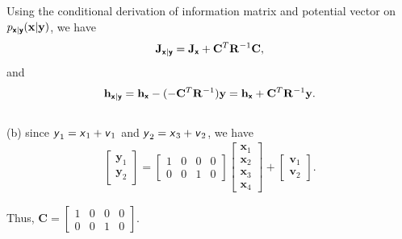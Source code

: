 \documentclass{article}
\newcommand{\s}[1]{\textsf{\textit{#1}}}
\newcommand{\bs}[1]{\textsf{\textbf{#1}}}
\newcommand{\bm}{\mathbf}
\begin{document}
Using the conditional derivation of information matrix and potential vector on $p_{\bs{x}|\bs{y}}(\bm{x}| \bm{y})$, we have
\begin{align*}
	\bm{J}_{\bs{x}|\bs{y}} = \bm{J}_\bs{x}+\bm{C}^T\bm{R}^{-1}\bm{C},
\end{align*}
and
\begin{align*}
	\bm{h}_{\bs{x}|\bs{y}} = \bm{h}_{\bs{x}} - (-\bm{C}^T\bm{R}^{-1})\bm{y} = \bm{h}_{\bs{x}} + \bm{C}^T\bm{R}^{-1}\bm{y}.
\end{align*}
\\

\noindent
(b) since $\s{y}_1 = \s{x}_1 + \s{v}_1$ and $\s{y}_2 = \s{x}_3 + \s{v}_2$, we have
\begin{align*}
\begin{bmatrix}
    \bm{y}_{1}\\
    \bm{y}_{2}
\end{bmatrix} = 
\begin{bmatrix}
    1 & 0 & 0 & 0 \\
    0 & 0 & 1 & 0
\end{bmatrix}
\begin{bmatrix}
    \bm{x}_{1}\\
    \bm{x}_{2}\\
    \bm{x}_{3}\\
    \bm{x}_{4}
\end{bmatrix} + 
\begin{bmatrix}
    \bm{v}_{1}\\
    \bm{v}_{2}
\end{bmatrix}.
\end{align*}
%

Thus, $\bm{C} =
\begin{bmatrix}
    1 & 0 & 0 & 0 \\
    0 & 0 & 1 & 0
\end{bmatrix}$.
%
\end{document}
